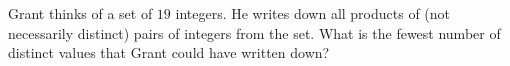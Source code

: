 Grant thinks of a set of $19$ integers. He writes down all products of (not necessarily distinct) pairs of integers from the set. What is the fewest number of distinct values that Grant could have written down?

